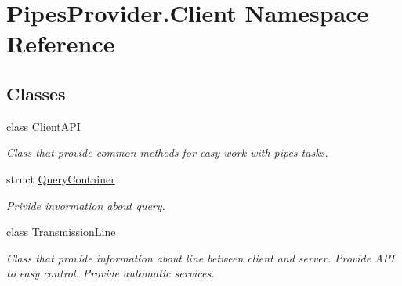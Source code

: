 \hypertarget{namespace_pipes_provider_1_1_client}{}\section{Pipes\+Provider.\+Client Namespace Reference}
\label{namespace_pipes_provider_1_1_client}
\subsection*{Classes}
\begin{DoxyCompactItemize}
\item 
class \mbox{\hyperlink{class_pipes_provider_1_1_client_1_1_client_a_p_i}{Client\+A\+PI}}
\begin{DoxyCompactList}\small\item\em Class that provide common methods for easy work with pipes\textquotesingle{} tasks. \end{DoxyCompactList}\item 
struct \mbox{\hyperlink{struct_pipes_provider_1_1_client_1_1_query_container}{Query\+Container}}
\begin{DoxyCompactList}\small\item\em Privide invormation about query. \end{DoxyCompactList}\item 
class \mbox{\hyperlink{class_pipes_provider_1_1_client_1_1_transmission_line}{Transmission\+Line}}
\begin{DoxyCompactList}\small\item\em Class that provide information about line between client and server. Provide A\+PI to easy control. Provide automatic services. \end{DoxyCompactList}\end{DoxyCompactItemize}
